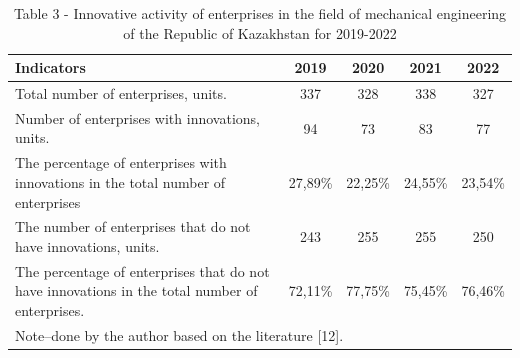 \begin{table}[H]
\caption*{Table 3 - Innovative activity of enterprises in the field of mechanical engineering of the Republic of Kazakhstan for 2019-2022}
\centering
\begin{tabular}{|lcccc|}
\hline
\multicolumn{1}{|l|}{\textbf{Indicators}} &
  \multicolumn{1}{c|}{\textbf{2019}} &
  \multicolumn{1}{c|}{\textbf{2020}} &
  \multicolumn{1}{c|}{\textbf{2021}} &
  \textbf{2022} \\ \hline
\multicolumn{1}{|p{0.5\textwidth}|}{Total number of enterprises, units.} &
  \multicolumn{1}{c|}{337} &
  \multicolumn{1}{c|}{328} &
  \multicolumn{1}{c|}{338} &
  327 \\ \hline
\multicolumn{1}{|p{0.5\textwidth}|}{Number of enterprises with innovations, units.} &
  \multicolumn{1}{c|}{94} &
  \multicolumn{1}{c|}{73} &
  \multicolumn{1}{c|}{83} &
  77 \\ \hline
\multicolumn{1}{|p{0.5\textwidth}|}{The percentage of enterprises with innovations in the total number of enterprises} &
  \multicolumn{1}{c|}{27,89\%} &
  \multicolumn{1}{c|}{22,25\%} &
  \multicolumn{1}{c|}{24,55\%} &
  23,54\% \\ \hline
\multicolumn{1}{|p{0.5\textwidth}|}{The number of enterprises that do not have innovations, units.} &
  \multicolumn{1}{c|}{243} &
  \multicolumn{1}{c|}{255} &
  \multicolumn{1}{c|}{255} &
  250 \\ \hline
\multicolumn{1}{|p{0.5\textwidth}|}{The percentage of enterprises that do not have innovations in the total number of enterprises.} &
  \multicolumn{1}{c|}{72,11\%} &
  \multicolumn{1}{c|}{77,75\%} &
  \multicolumn{1}{c|}{75,45\%} &
  76,46\% \\ \hline
\multicolumn{5}{|l|}{Note–done by the author based on the literature {[}12{]}.} \\ \hline
\end{tabular}
\end{table}

